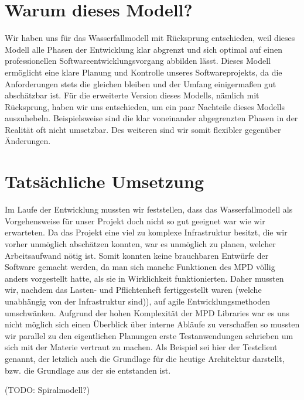 \section{Warum dieses Modell?}
Wir haben uns für das Wasserfallmodell mit Rücksprung entschieden, weil dieses Modell alle Phasen der 
Entwicklung klar abgrenzt und sich optimal auf einen professionellen Softwareentwicklungsvorgang
abbilden lässt. Dieses Modell ermöglicht eine klare Planung und Kontrolle unseres Softwareprojekts,
da die Anforderungen stets die gleichen bleiben und der Umfang einigermaßen gut abschätzbar ist.
Für die erweiterte Version dieses Modells, nämlich mit Rücksprung, haben wir uns entschieden, um ein 
paar Nachteile dieses Modells auszuhebeln. Beispielsweise sind die klar voneinander abgegrenzten Phasen
in der Realität oft nicht umsetzbar. Des weiteren sind wir somit flexibler gegenüber Änderungen.
\section{Tatsächliche Umsetzung}
Im Laufe der Entwicklung mussten wir feststellen, dass das Wasserfallmodell als Vorgehensweise für unser
Projekt doch nicht so gut geeignet war wie wir erwarteten. Da das Projekt eine viel zu komplexe Infrastruktur
besitzt, die wir vorher unmöglich abschätzen konnten, war es unmöglich zu planen, welcher Arbeitsaufwand nötig ist.
Somit konnten keine brauchbaren Entwürfe der Software gemacht werden, da man sich manche Funktionen des MPD
völlig anders vorgestellt hatte, als sie in Wirklichkeit funktionierten. Daher mussten wir, nachdem
das Lasten- und Pflichtenheft fertiggestellt waren (welche unabhängig von der Infrastruktur sind)), auf agile
Entwicklungsmethoden umschwänken. Aufgrund der hohen Komplexität der MPD Libraries war es uns nicht möglich
sich einen Überblick über interne Abläufe zu verschaffen so mussten wir parallel zu den eigentlichen Planungen
erste Testanwendungen schrieben um sich mit der Materie vertraut zu machen.
Als Beispiel sei hier der Testclient genannt, der letzlich auch die Grundlage für die heutige
Architektur darstellt, bzw. die Grundlage aus der sie entstanden ist.

(TODO: Spiralmodell?)